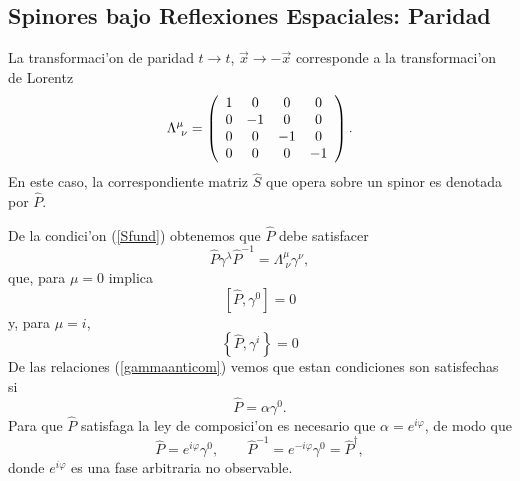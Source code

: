 \subsection{Spinores bajo Reflexiones Espaciales: Paridad}

La transformaci'on de paridad $t\rightarrow t$, $\vec{x}\rightarrow -\vec{x}$
corresponde a la transformaci'on de Lorentz
\begin{equation}
\Lambda_{\ \nu}^{\mu}=\left(
\begin{array}
[c]{cccc}%
1 & 0 & 0 & 0\\
0 & -1 & 0 & 0\\
0 & 0 & -1 & 0\\
0 & 0 & 0 & -1
\end{array}
\right) .
\end{equation}
En este caso, la correspondiente matriz $\hat{S}$ que opera sobre un
spinor es denotada por $\hat{P}$. 

De la condici'on (\ref{Sfund}) obtenemos que $\hat{P}$ debe satisfacer
\begin{equation}
 \hat{P}\gamma^\lambda\hat{P}^{-1} =\Lambda^\mu_{\ \nu}\gamma^\nu,
\end{equation} 
que, para $\mu=0$ implica
\begin{equation}
\left[\hat{P},\gamma^0\right]=0
\end{equation} 
y, para $\mu=i$, 
\begin{equation}
\left\{\hat{P},\gamma^i\right\}=0
\end{equation} 
De las relaciones (\ref{gammaanticom}) vemos que estan condiciones son
satisfechas si
\begin{equation}
 \hat{P}=\alpha \gamma^0.
\end{equation} 
Para que $\hat{P}$ satisfaga la ley de composici'on es necesario que
$\alpha=e^{i\varphi}$, de modo que
\begin{equation}
\hat{P} =e^{i\varphi}\gamma^0, \qquad 
\hat{P}^{-1}  =e^{-i\varphi}\gamma^0=\hat{P}^\dagger ,
\end{equation}
donde $e^{i\varphi}$ es una fase arbitraria no observable.

